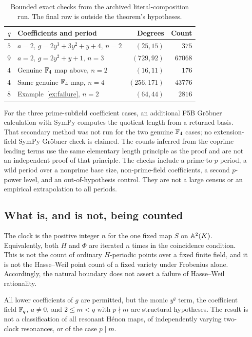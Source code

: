 \begin{table}[htbp]
\centering
\small
\begin{tabular}{@{}clrr@{}}
\toprule
$q$ & Coefficients and period & Degrees & Count\\
\midrule
$5$ & $a=2$, $g=2y^3+3y^2+y+4$, $n=2$ & $(25,15)$ & $375$\\
$9$ & $a=2$, $g=2y^2+y+1$, $n=3$ & $(729,92)$ & $67068$\\
$4$ & Genuine $\mathbb F_4$ map above, $n=2$ & $(16,11)$ & $176$\\
$4$ & Same genuine $\mathbb F_4$ map, $n=4$ & $(256,171)$ & $43776$\\
$8$ & Example~\ref{ex:failure}, $n=2$ & $(64,44)$ & $2816$\\
\bottomrule
\end{tabular}
\caption{Bounded exact checks from the archived literal-composition run.
The final row is outside the theorem's hypotheses.}\label{tab:checks}
\end{table}

For the three prime-subfield coefficient cases, an additional F5B
Gr\"obner calculation with SymPy computes the quotient length from a
returned basis. That secondary method was not run for the two genuine
$\mathbb F_4$ cases; no extension-field SymPy Gr\"obner check is claimed.
The counts inferred from the coprime leading terms use the same
elementary length principle as the proof and are not an independent
proof of that principle. The checks include a prime-to-$p$ period,
a wild period over a nonprime base size, non-prime-field coefficients,
a second $p$-power level, and an out-of-hypothesis control. They are
not a large census or an empirical extrapolation to all periods.

\subsection{What is, and is not, being counted}

The clock is the positive integer $n$ for the one fixed map $S$ on
$\mathbb A^2(K)$. Equivalently, both $H$ and $\Phi$ are iterated $n$ times
in the coincidence condition. This is not the count of ordinary
$H$-periodic points over a fixed finite field, and it is not the
Hasse--Weil point count of a fixed variety under Frobenius alone.
Accordingly, the natural boundary does not assert a failure of
Hasse--Weil rationality.

All lower coefficients of $g$ are permitted, but the monic $y^q$ term,
the coefficient field $\mathbb F_q$, $a\ne0$, and $2\le m<q$ with $p\nmid m$
are structural hypotheses. The result is not a classification of all
resonant H\'enon maps, of independently varying two-clock resonances,
or of the case $p\mid m$.
